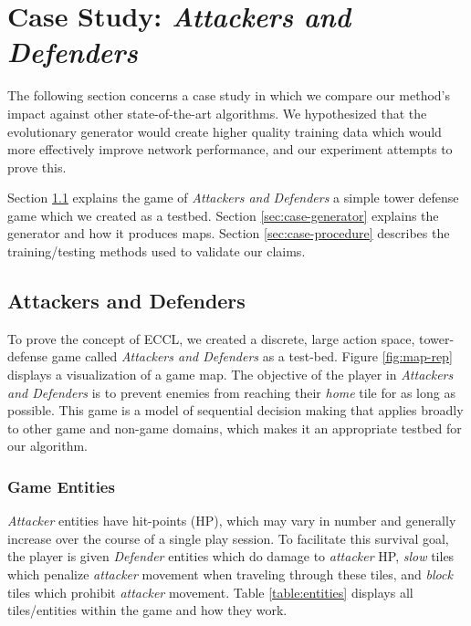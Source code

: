 \documentclass[letterpaper]{article} %
\begin{document}
\section{Case Study: \textit{Attackers and Defenders}}\label{sec:case}
The following section concerns a case study in which we compare our method's impact against other state-of-the-art algorithms. We hypothesized that the evolutionary generator would create higher quality training data which would more effectively improve network performance, and our experiment attempts to prove this.

Section \ref{sec:case-game} explains the game of \textit{Attackers and Defenders} a simple tower defense game which we created as a testbed. Section \ref{sec:case-generator} explains the generator and how it produces maps. Section \ref{sec:case-procedure} describes the training/testing methods used to validate our claims.

\subsection{Attackers and Defenders}\label{sec:case-game}
To prove the concept of ECCL, we created a discrete, large action space, tower-defense game called \textit{Attackers and Defenders} as a test-bed. Figure \ref{fig:map-rep} displays a visualization of a game map. The objective of the player in \textit{Attackers and Defenders} is to prevent enemies from reaching their \textit{home} tile for as long as possible. This game is a model of sequential decision making that applies broadly to other game and non-game domains, which makes it an appropriate testbed for our algorithm.


\subsubsection{Game Entities}\label{sec:case-game-tiles}
\textit{Attacker} entities have hit-points (HP), which may vary in number and generally increase over the course of a single play session. To facilitate this survival goal, the player is given \textit{Defender} entities which do damage to \textit{attacker} HP, \textit{slow} tiles which penalize \textit{attacker} movement when traveling through these tiles, and \textit{block} tiles which prohibit \textit{attacker} movement. Table \ref{table:entities} displays all tiles/entities within the game and how they work.
\end{document}
